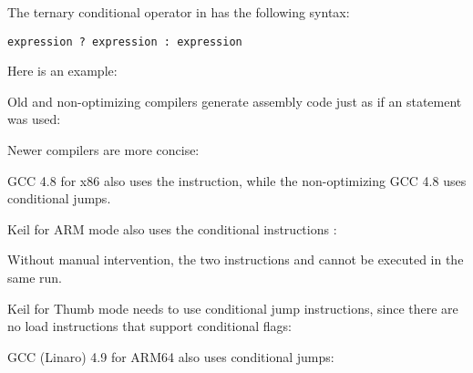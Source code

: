 \label{chap:cond}

The ternary conditional operator in \CCpp has the following syntax:

\begin{lstlisting}
expression ? expression : expression
\end{lstlisting}

Here is an example:




Old and non-optimizing compilers generate assembly code just as if an  statement was used:





Newer compilers are more concise:



\Optimizing GCC 4.8 for x86 also uses the  instruction, while the non-optimizing GCC 4.8 uses conditional jumps.


\Optimizing Keil for ARM mode also uses the conditional instructions :



Without manual intervention, the two instructions  and  cannot be executed in the same run.

\Optimizing Keil for Thumb mode needs to use conditional jump instructions, since there are no load instructions
that support conditional flags:




\Optimizing GCC (Linaro) 4.9 for ARM64 also uses conditional jumps:



